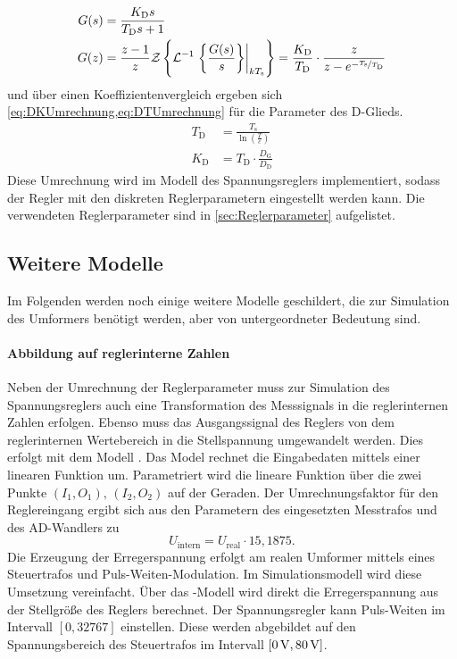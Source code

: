 \begin{align}
	G(s) &= \frac{K_\mathrm{D}s}{T_\mathrm{D}s+1}\label{eq:SD}\\
	G(z) &= \frac{z-1}{z} \mathcal{Z}\left\{ \mathcal{L}^{-1}\left.\left\{\frac{G(s)}{s}\right\}\right|_{kT_{\mathrm{s}}} \right\} = \frac{K_\mathrm{D}}{T_\mathrm{D}}\cdot\frac{z}{z-e^{-\nicefrac{T_\mathrm{s}}{T_\mathrm{D}}}}\label{eq:ZD}
\end{align}
und über einen Koeffizientenvergleich ergeben sich \cref{eq:DKUmrechnung,eq:DTUmrechnung} für die Parameter des D-Glieds.
\begin{align}
	T_\mathrm{D} &= \frac{T_\mathrm{s}}{\ln(\frac{T}{c})}\label{eq:DTUmrechnung}\\
	K_\mathrm{D} &= T_\mathrm{D}\cdot\frac{D_\mathrm{G}}{D_\mathrm{D}}\label{eq:DKUmrechnung}
\end{align}
Diese Umrechnung wird im Modell des Spannungsreglers implementiert, sodass der Regler mit den diskreten Reglerparametern eingestellt werden kann. Die verwendeten Reglerparameter sind in \cref{sec:Reglerparameter} aufgelistet.

\subsection{Weitere Modelle}\label{sec:WeitereModelle}
Im Folgenden werden noch einige weitere Modelle geschildert, die zur Simulation des Umformers benötigt werden, aber von untergeordneter Bedeutung sind.

\paragraph{Abbildung auf reglerinterne Zahlen}
\label{sec:AbbildungReglerZahlen}
Neben der Umrechnung der Reglerparameter muss zur Simulation des Spannungsreglers auch eine Transformation des Messsignals in die reglerinternen Zahlen erfolgen. Ebenso muss das Ausgangssignal des Reglers von dem reglerinternen Wertebereich in die Stellspannung umgewandelt werden. Dies erfolgt mit dem Modell . Das Model rechnet die Eingabedaten mittels einer linearen Funktion um. Parametriert wird die lineare Funktion über die zwei Punkte $(I_1,O_1),\,(I_2,O_2)$ auf der Geraden. Der Umrechnungsfaktor für den Reglereingang ergibt sich aus den Parametern des eingesetzten Messtrafos und des AD-Wandlers zu
\begin{equation}
	U_\mathrm{intern} = U_\mathrm{real}\cdot 15,1875.
\end{equation}
Die Erzeugung der Erregerspannung erfolgt am realen Umformer mittels eines Steuertrafos und Puls-Weiten-Modulation. Im Simulationsmodell wird diese Umsetzung vereinfacht. Über das -Modell wird direkt die Erregerspannung aus der Stellgröße des Reglers berechnet. Der Spannungsregler kann Puls-Weiten im Intervall $[0,32767]$ einstellen. Diese werden abgebildet auf den Spannungsbereich des Steuertrafos im Intervall $[\unit[0]{V},\unit[80]{V}]$. %

